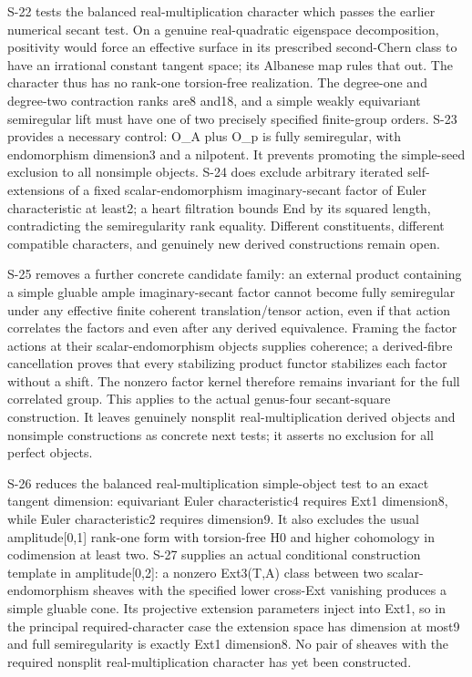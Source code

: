 \documentclass[11pt,a4paper]{article}
\theoremstyle{definition}
\begin{document}
S-22 tests the balanced real-multiplication character which passes the
earlier numerical secant test. On a genuine real-quadratic eigenspace
decomposition, positivity would force an effective surface in its
prescribed second-Chern class to have an irrational constant tangent
space; its Albanese map rules that out. The character thus has no
rank-one torsion-free realization. The degree-one and degree-two
contraction ranks are8 and18, and a simple weakly equivariant
semiregular lift must have one of two precisely specified finite-group
orders. S-23 provides a necessary control: O\_A plus O\_p is fully
semiregular, with endomorphism dimension3 and a nilpotent. It prevents
promoting the simple-seed exclusion to all nonsimple objects. S-24 does
exclude arbitrary iterated self-extensions of a fixed
scalar-endomorphism imaginary-secant factor of Euler characteristic at
least2; a heart filtration bounds End by its squared length,
contradicting the semiregularity rank equality. Different constituents,
different compatible characters, and genuinely new derived constructions
remain open.

S-25 removes a further concrete candidate family: an external product
containing a simple gluable ample imaginary-secant factor cannot become
fully semiregular under any effective finite coherent translation/tensor
action, even if that action correlates the factors and even after any
derived equivalence. Framing the factor actions at their
scalar-endomorphism objects supplies coherence; a derived-fibre
cancellation proves that every stabilizing product functor stabilizes
each factor without a shift. The nonzero factor kernel therefore remains
invariant for the full correlated group. This applies to the actual
genus-four secant-square construction. It leaves genuinely nonsplit
real-multiplication derived objects and nonsimple constructions as
concrete next tests; it asserts no exclusion for all perfect objects.

S-26 reduces the balanced real-multiplication simple-object test to an
exact tangent dimension: equivariant Euler characteristic4 requires Ext1
dimension8, while Euler characteristic2 requires dimension9. It also
excludes the usual amplitude{[}0,1{]} rank-one form with torsion-free H0
and higher cohomology in codimension at least two. S-27 supplies an
actual conditional construction template in amplitude{[}0,2{]}: a
nonzero Ext3(T,A) class between two scalar-endomorphism sheaves with the
specified lower cross-Ext vanishing produces a simple gluable cone. Its
projective extension parameters inject into Ext1, so in the principal
required-character case the extension space has dimension at most9 and
full semiregularity is exactly Ext1 dimension8. No pair of sheaves with
the required nonsplit real-multiplication character has yet been
constructed.
\end{document}
